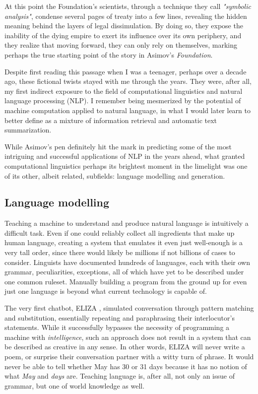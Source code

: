 At this point the Foundation's scientists, through a technique they call \emph{"symbolic analysis"}, condense several pages of treaty into a few lines, revealing the hidden meaning behind the layers of legal dissimulation.
By doing so, they expose the inability of the dying empire to exert its influence over its own periphery, and they realize that moving forward, they can only rely on themselves, marking perhaps the true starting point of the story in Asimov's \emph{Foundation}.

Despite first reading this passage when I was a teenager, perhaps over a decade ago, these fictional twists stayed with me through the years.
They were, after all, my first indirect exposure to the field of computational linguistics and natural language processing (NLP).
I remember being mesmerized by the potential of machine computation applied to natural language, in what I would later learn to better define as a mixture of information retrieval and automatic text summarization.

While Asimov's pen definitely hit the mark in predicting some of the most intriguing and successful applications of NLP in the years ahead, what granted computational linguistics perhaps its brightest moment in the limelight was one of its other, albeit related, subfields: language modelling and generation.

\subsection{Language modelling}

Teaching a machine to understand and produce natural language is intuitively a difficult task.
Even if one could reliably collect all ingredients that make up human language, creating a system that emulates it even just well-enough is a very tall order, since there would likely be millions if not billions of cases to consider.
Linguists have documented hundreds of languages, each with their own grammar, peculiarities, exceptions, all of which have yet to be described under one common ruleset.
Manually building a program from the ground up for even just one language is beyond what current technology is capable of.

The very first chatbot, ELIZA \citep{weizenbaum1966eliza}, simulated conversation through pattern matching and substitution, essentially repeating and paraphrasing their interlocutor's statements.
While it successfully bypasses the necessity of programming a machine with \emph{intelligence}, such an approach does not result in a system that can be described as creative in any sense.
In other words, ELIZA will never write a poem, or surprise their conversation partner with a witty turn of phrase.
It would never be able to tell whether May has 30 or 31 days because it has no notion of what \emph{May} and \emph{days} are.
Teaching language is, after all, not only an issue of grammar, but one of world knowledge as well.

